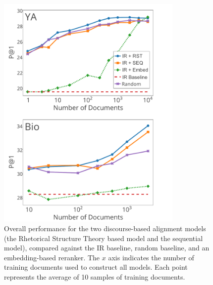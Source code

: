 \begin{figure}[t!]
\begin{center}
\includegraphics[width=90mm]{mainmatter/naacl2015-alignment/graphs_new2.pdf}
\caption{{\small Overall performance for the two discourse-based alignment models (the Rhetorical Structure Theory based model and the sequential model),
compared against the IR baseline, random baseline, and an embedding-based reranker.
The $x$ axis indicates the number of training documents used to construct all models. 
Each point represents the average of 10 samples of training documents.  }}
\label{fig:performance}
\end{center}
\end{figure}


